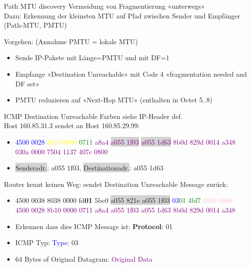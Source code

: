 \begin{KR}{Path MTU discovery} Vermeidung von Fragmentierung «unterwegs»\\
    Dazu: Erkennung der kleinsten MTU auf Pfad zwischen Sender und Empfänger (Path-MTU, PMTU)
    
    Vorgehen: (Annahme PMTU = lokale MTU)
    \begin{itemize}
        \item Sende IP-Pakete mit Länge=PMTU und mit DF=1
        \item Empfange «Destination Unreachable» mit Code 4 «fragmentation needed and DF set»
        \item PMTU reduzieren auf «Next-Hop MTU» (enthalten in Octet 5..8)
    \end{itemize}
\end{KR}

\begin{example2}{ICMP Destination Unreachable} Farben siehe IP-Header def.\\
    Host 160.85.31.3 sendet an Host 160.85.29.99:
    \begin{itemize}
        \item \textcolor{blue}{4500 0028} \textcolor{yellow}{8b10 0000} \textcolor{green}{0711} \textcolor{purple}{a8a4 \colorbox{lightgrey}{a055 1f03} \colorbox{lightgrey}{a055 1d63} 8b0d 829d 0014 a348 030a 0000 7504 1137 407c 0800}
        \item \colorbox{lightgrey}{Senderadr.}: a055 1f03, \colorbox{lightgrey}{Destinationadr.}: a055 1d63
    \end{itemize}
    Router kennt keinen Weg: sendet Destination Unreachable Message zurück:
    \begin{itemize}
        \item 4500 0038 8038 0000 fd\textbf{01} 5bc0 \colorbox{lightgrey}{a055 821e a055 1f03} \textcolor{blue}{03}\textcolor{green}{01 4bf7} \textcolor{pink}{0000 0000} \textcolor{purple}{4500 0028 8b10 0000 0711 a8a4 a055 1f03 a055 1d63 8b0d 829d 0014 a348}
        \item Erkennen dass dies ICMP Message ist: \textbf{Protocol}: 01
        \item ICMP Typ: \textcolor{blue}{Type}: 03
        \item 64 Bytes of Original Datagram: \textcolor{purple}{Original Data}
    \end{itemize}
\end{example2}













